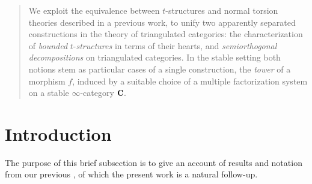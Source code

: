 \begin{abstract}
We exploit the equivalence between $t$-structures and normal torsion theories described in a previous work, to unify two apparently separated constructions in the theory of triangulated categories: the characterization of \emph{bounded} $t$-\emph{structures} in terms of their hearts, and \emph{semiorthogonal decompositions} on triangulated categories. In the stable setting both notions stem as particular cases of a single construction, the \emph{tower} of a morphism $f$, induced by a suitable choice of a multiple factorization system on a stable $\infty$-category $\C$. 
\end{abstract}
\section{Introduction}
The purpose of this brief subsection is to give an account of results and notation from our previous \cite{FL0}, of which the present work is a natural follow-up. 

